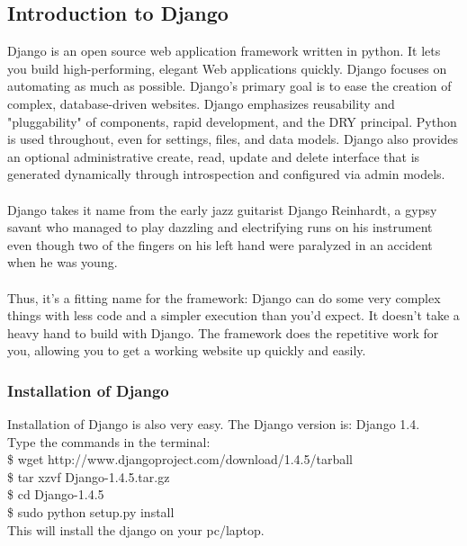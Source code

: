 \subsection{Introduction to Django}
\hspace{-1.8em} Django is an open source web application framework written in python. It lets 
you build high-performing, elegant Web applications quickly. Django 
focuses on automating as much as possible. Django's primary goal is to 
ease the creation of complex, database-driven websites. Django 
emphasizes reusability and "pluggability" of components, rapid 
development, and the DRY principal. Python is used throughout, even 
for settings, files, and data models. Django also provides an optional
 administrative create, read, update and delete interface that is 
generated dynamically through introspection and configured via admin 
models.\\\\
Django takes it name from the early jazz guitarist Django Reinhardt, 
a gypsy savant who managed to play dazzling and electrifying runs on 
his instrument even though two of the fingers on his left hand were 
paralyzed in an accident when he was young.\\\\
Thus, it’s a fitting name for the framework: Django can do some very 
complex things with less code and a simpler execution than you’d expect. 
It doesn’t take a heavy hand to build with Django. The framework does 
the repetitive work for you, allowing you to get a working website up 
quickly and easily.
\subsubsection{Installation of Django}
Installation of Django is also very easy.
The Django version is: Django 1.4.\\
Type the commands in the terminal:\\

	\$ wget http://www.djangoproject.com/download/1.4.5/tarball\\


	\$ tar xzvf Django-1.4.5.tar.gz\\


	\$ cd Django-1.4.5\\


	\$ sudo python setup.py install \\

\noindent This will install the django on your pc/laptop.


